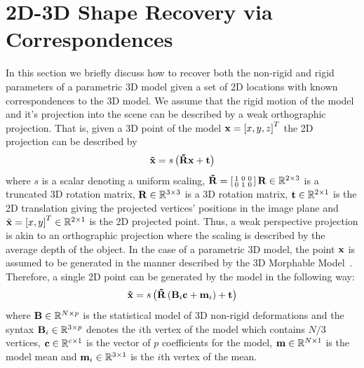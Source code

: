 \section{2D-3D Shape Recovery via Correspondences}\label{sec:face_flow_3d_recovery}
In this section we briefly discuss how to recover both the non-rigid and rigid
parameters of a parametric 3D model given a set of 2D locations with known
correspondences to the 3D model. We assume that the rigid motion of the model
and it's projection into the scene can be described by a weak orthographic
projection. That is, given a 3D point of the model $\boldsymbol{\mathbf{x}} = {[x, y, z]}^T$ the
2D projection can be described by
\begin{equation}
\boldsymbol{\mathbf{\tilde{x}}} = s \left( \boldsymbol{\mathbf{\tilde{R}}} \boldsymbol{\mathbf{x}} + \boldsymbol{\mathbf{t}} \right)
\end{equation}
where $s$ is a scalar denoting a uniform scaling,
$\boldsymbol{\mathbf{\tilde{R}}} = \left[\begin{smallmatrix} 1&0&0\\0&1&0 \end{smallmatrix}\right] \boldsymbol{\mathbf{R}} \in \mathbb{R}^{2 \times 3}$
is a truncated 3D rotation matrix, $\boldsymbol{\mathbf{R}} \in \mathbb{R}^{3 \times 3}$ is a 3D rotation matrix,
$\boldsymbol{\mathbf{t}} \in \mathbb{R}^{2 \times 1}$ is the 2D translation giving the projected vertices'
positions in the image plane and
$\tilde{\boldsymbol{\mathbf{x}}} = {[x, y]}^T \in \mathbb{R}^{2 \times 1}$ is the 2D projected point.
Thus, a weak perspective projection is akin to an orthographic projection where the scaling
is described by the average depth of the object. In the case of a parametric 3D
model, the point $\boldsymbol{\mathbf{x}}$ is assumed to be generated in the manner described
by the 3D Morphable Model~\cite{volker1999morphable}. Therefore, a single 2D
point can be generated by the model in the following way:
\begin{equation}
\boldsymbol{\mathbf{\tilde{x}}} = s \left( \boldsymbol{\mathbf{\tilde{R}}} \left(\boldsymbol{\mathbf{B}}_i \boldsymbol{\mathbf{c}} + \boldsymbol{\mathbf{m}}_i\right) + \boldsymbol{\mathbf{t}} \right)
\end{equation}
where $\boldsymbol{\mathbf{B}} \in \mathbb{R}^{N \times p}$ is the statistical model of 3D non-rigid deformations
and the syntax $\boldsymbol{\mathbf{B}}_i \in \mathbb{R}^{3 \times p}$ denotes the $i$th vertex of the model which
contains $N / 3$ vertices,
$\boldsymbol{\mathbf{c}} \in \mathbb{R}^{c \times 1}$ is the vector of $p$ coefficients for the model,
$\boldsymbol{\mathbf{m}} \in \mathbb{R}^{N \times 1}$ is the model mean and $\boldsymbol{\mathbf{m}}_i \in \mathbb{R}^{3 \times 1}$
is the $i$th vertex of the mean.

